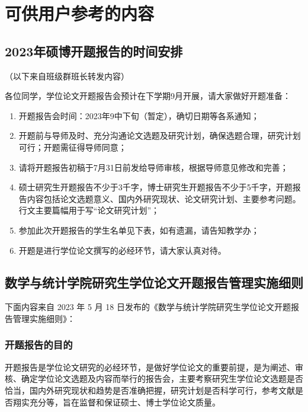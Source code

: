 
\section{可供用户参考的内容}

\subsection{2023年硕博开题报告的时间安排}

（以下来自班级群班长转发内容\cite{2024届硕博开题报告QQ通知}）

各位同学，学位论文开题报告会预计在下学期9月开展，请大家做好开题准备：
\begin{enumerate}
  \item 开题报告会时间：2023年9中下旬（暂定），确切日期等各系通知；
  \item 开题前与导师及时、充分沟通论文选题及研究计划，确保选题合理，研究计划可行；开题需征得导师同意；
  \item 请将开题报告初稿于7月31日前发给导师审核，根据导师意见修改和完善；
  \item 硕士研究生开题报告不少于3千字，博士研究生开题报告不少于5千字，开题报告内容包括论文选题意义、国内外研究现状、论文研究计划、主要参考问题。行文主要篇幅用于写“论文研究计划”；
  \item 参加此次开题报告的学生名单见下表，如有遗漏，请告知教学办；
  \item 开题是进行学位论文撰写的必经环节，请大家认真对待。
\end{enumerate}


\subsection{数学与统计学院研究生学位论文开题报告管理实施细则}

下面内容来自 2023 年 5 月 18 日发布的《数学与统计学院研究生学位论文开题报告管理实施细则》\cite{数学与统计学院研究生学位论文开题报告管理实施细则}：

\subsubsection{开题报告的目的}

开题报告是学位论文研究的必经环节，是做好学位论文的重要前提，是为阐述、审核、确定学位论文选题及内容而举行的报告会，主要考察研究生学位论文选题是否恰当，国内外研究现状和趋势是否准确把握，研究计划是否科学可行，参考文献是否翔实充分等，旨在监督和保证硕士、博士学位论文质量。


